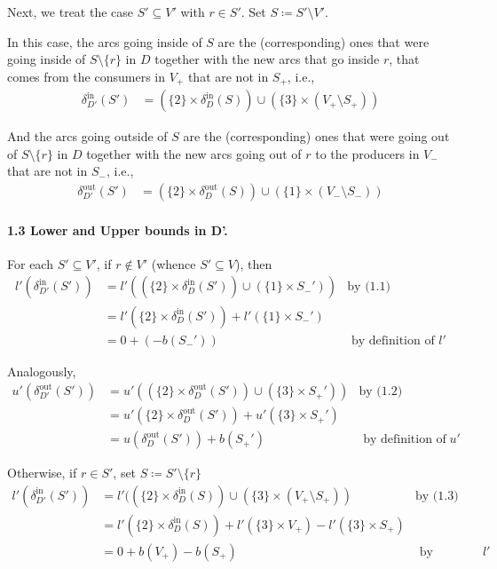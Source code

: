 \documentclass[a4paper,10pt, leqno]{article}
\theoremstyle{definition}
\begin{document}
Next, we treat the case $S' \subseteq V'$ with $r \in S'$. Set $S \coloneqq S' \setminus V'$.

In this case, the arcs going inside of $S$ are the (corresponding) ones that were going inside of $S \setminus \{r\}$ in $D$ together with the new arcs that go inside $r$, that comes from the consumers in $V_+$ that are not in $S_+$, i.e.,
\begin{align*}
\tag{1.3}
    \delta_{D'}^{\text{in}}(S') &= (\{2\}\times\delta_{D}^{\text{in}}(S)) \cup (\{3\} \times (V_+ \setminus S_+)) 
\end{align*}

And the arcs going outside of $S$ are the (corresponding) ones that were going out of $S \setminus \{r\}$ in $D$ together with the new arcs going out of $r$ to the producers in $V_-$ that are not in $S_-$, i.e.,
\begin{align*}
\tag{1.4}
    \delta_{D'}^{\text{out}}(S') &= (\{2\}\times\delta_{D}^{\text{out}}(S)) \cup (\{1\} \times (V_- \setminus S_-)) 
\end{align*}

\paragraph{1.3 Lower and Upper bounds in D'.}
For each $S' \subseteq V'$, if $r \notin V'$ (whence $S ' \subseteq V$), then
\begin{align*}
 l'(\delta_{D'}^{\text{in}}(S')) &= l'((\{2\}\times\delta_{D}^{\text{in}}(S')) \cup (\{1\} \times S_{-}')) &\text{by (1.1)} \\
 &= l'(\{2\}\times\delta_{D}^{\text{in}}(S')) + l'(\{1\} \times S_{-}') \\
 &= 0 + (-b(S_-')) &\text{ by definition of }l'
\end{align*}

Analogously,
\begin{align*}
 u'(\delta_{D'}^{\text{out}}(S')) &= u'((\{2\}\times\delta_{D}^{\text{out}}(S')) \cup (\{3\} \times S_+')) &\text{by (1.2)}\\
 &= u'(\{2\}\times\delta_{D}^{\text{out}}(S')) + u'(\{3\} \times S_+') \\
 &= u(\delta_{D}^{\text{out}}(S')) + b(S_+') &\text{ by definition of }u' 
\end{align*}

Otherwise, if $r \in S'$, set $S \coloneqq S' \setminus \{r\}$  
\begin{align*}
 l'(\delta_{D'}^{\text{in}}(S')) &= l'((\{2\}\times\delta_{D}^{\text{in}}(S)) \cup (\{3\} \times (V_+ \setminus S_+)) &\text{by (1.3)} \\
 &= l'(\{2\}\times\delta_{D}^{\text{in}}(S)) + l'(\{3\} \times V_+) - l'(\{3\} \times S_+)\\
 &= 0 + b(V_+) - b(S_+) &\text{ by definition of }l'
\end{align*}
\end{document}
